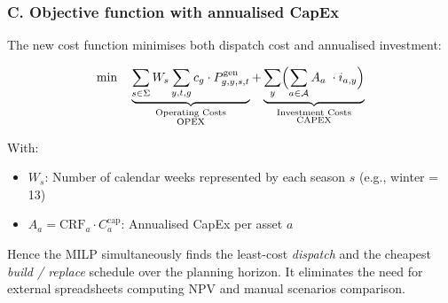 \subsubsection*{C.  Objective function with annualised CapEx}
\label{ssec:MILP_objective}

\begin{adjustwidth}{1.5em}{0pt}  %
The new cost function minimises both dispatch cost and annualised investment:

\begin{equation}
    \min \quad
    \underbrace{\sum_{s \in \Sigma} W_s \sum_{y,t,g} c_g \cdot P^{\text{gen}}_{g,y,s,t}}_{\substack{\text{Operating Costs} \\ \text{OPEX}}}
    +
    \underbrace{\sum_{y}\Bigl(
    \sum_{a\in\mathcal{A}}
        A_a \;\cdot i_{a,y}\Bigr)}_{\substack{\text{Investment Costs} \\ \text{CAPEX}}}
\end{equation}

With:
\begin{itemize}
    \item $W_s$: Number of calendar weeks represented by each season $s$ (e.g., winter = 13)
    \item $A_a = \mathrm{CRF}_a \cdot C^{\text{cap}}_a$: Annualised CapEx per asset $a$
\end{itemize}

Hence the MILP simultaneously finds the least-cost \emph{dispatch} and the cheapest \emph{build / replace} schedule over the planning horizon. It eliminates the need for external spreadsheets computing NPV and manual scenarios comparison.
\end{adjustwidth}
